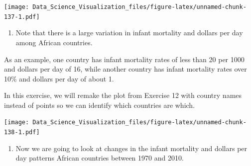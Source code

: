 \documentclass[
]{article}
\newenvironment{Shaded}{\begin{snugshade}}{\end{snugshade}}
\newcommand{\DataTypeTok}[1]{\textcolor[rgb]{0.13,0.29,0.53}{#1}}
\newcommand{\DecValTok}[1]{\textcolor[rgb]{0.00,0.00,0.81}{#1}}
\newcommand{\KeywordTok}[1]{\textcolor[rgb]{0.13,0.29,0.53}{\textbf{#1}}}
\newcommand{\NormalTok}[1]{#1}
\newcommand{\OperatorTok}[1]{\textcolor[rgb]{0.81,0.36,0.00}{\textbf{#1}}}
\newcommand{\StringTok}[1]{\textcolor[rgb]{0.31,0.60,0.02}{#1}}
\providecommand{\tightlist}{%
  \setlength{\itemsep}{0pt}\setlength{\parskip}{0pt}}
\begin{document}
\texttt{[image: Data\_Science\_Visualization\_files/figure-latex/unnamed-chunk-137-1.pdf]}

\begin{enumerate}
\def\labelenumi{\arabic{enumi}.}
\setcounter{enumi}{12}
\tightlist
\item
  Note that there is a large variation in infant mortality and dollars
  per day among African countries.
\end{enumerate}

As an example, one country has infant mortality rates of less than 20
per 1000 and dollars per day of 16, while another country has infant
mortality rates over 10\% and dollars per day of about 1.

In this exercise, we will remake the plot from Exercise 12 with country
names instead of points so we can identify which countries are which.

\begin{Shaded}
\end{Shaded}

\texttt{[image: Data\_Science\_Visualization\_files/figure-latex/unnamed-chunk-138-1.pdf]}

\begin{enumerate}
\def\labelenumi{\arabic{enumi}.}
\setcounter{enumi}{13}
\tightlist
\item
  Now we are going to look at changes in the infant mortality and
  dollars per day patterns African countries between 1970 and 2010.
\end{enumerate}
\end{document}
